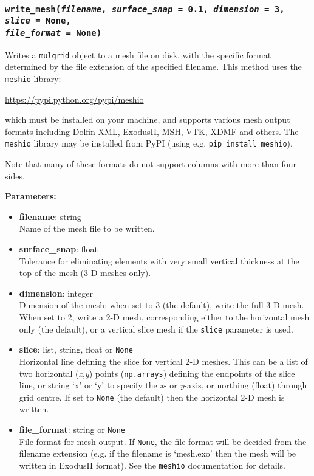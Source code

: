 \begin{snugshade}\subsubsection{\texttt{write\_mesh(\emph{filename}, \emph{surface\_snap} = 0.1, \emph{dimension} = 3, \emph{slice} = \texttt{None}, \\
      \emph{file\_format} = \texttt{None})}}\end{snugshade}
\label{sec:mulgrid:write_mesh}

Writes a \texttt{mulgrid} object to a mesh file on disk, with the specific format determined by the file extension of the specified filename. This method uses the \texttt{meshio} library:

\url{https://pypi.python.org/pypi/meshio}

which must be installed on your machine, and supports various mesh output formats including Dolfin XML, ExodusII, MSH, VTK, XDMF and others. The \texttt{meshio} library may be installed from PyPI (using e.g. \texttt{pip install meshio}).

Note that many of these formats do not support columns with more than four sides.

\textbf{Parameters:}
\begin{itemize}
\item \textbf{filename}: string\\
  Name of the mesh file to be written.
\item \textbf{surface\_snap}: float\\
  Tolerance for eliminating elements with very small vertical thickness at the top of the mesh (3-D meshes only).
\item \textbf{dimension}: integer\\
  Dimension of the mesh: when set to 3 (the default), write the full 3-D mesh. When set to 2, write a 2-D mesh, corresponding either to the horizontal mesh only (the default), or a vertical slice mesh if the \texttt{slice} parameter is used.
\item \textbf{slice}: list, string, float or \texttt{None}\\
  Horizontal line defining the slice for vertical 2-D meshes. This can be a list of two horizontal (\emph{x},\emph{y}) points (\texttt{np.arrays}) defining the endpoints of the slice line, or string `x' or `y' to specify the \emph{x}- or \emph{y}-axis, or northing (float) through grid centre. If set to \texttt{None} (the default) then the horizontal 2-D mesh is written.
\item \textbf{file\_format}: string or \texttt{None}\\
  File format for mesh output. If \texttt{None}, the file format will be decided from the filename extension (e.g. if the filename is `mesh.exo' then the mesh will be written in ExodusII format). See the \texttt{meshio} documentation for details.
\end{itemize}

